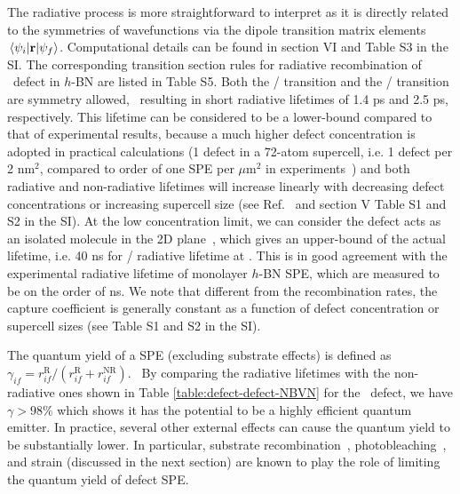 The radiative process is more straightforward to interpret as it is directly related to the symmetries of wavefunctions via the dipole transition matrix elements $\mel{\psi_i}{\textbf{r}}{\psi_f}$.
Computational details can be found in section VI and Table S3 in the SI. The corresponding transition section rules for radiative recombination of \NBVN\ defect in $h$-BN are listed in Table S5.
Both the / transition and the / transition are symmetry allowed,~\cite{abdi2018color} resulting in short radiative lifetimes of 1.4 ps and 2.5 ps, respectively. This lifetime can be considered to be a lower-bound compared to that of experimental results, because a much higher defect concentration is adopted in practical calculations (1 defect in a 72-atom supercell, i.e. 1 defect per 2 nm$^2$, compared to order of one SPE per $\mu$m$^2$ in experiments~\cite{tran2016quantum}) and both radiative and non-radiative lifetimes will increase linearly with decreasing defect concentrations or increasing supercell size (see Ref.~\cite{alkauskas2016tutorial} and section V Table S1 and S2 in the SI).
At the low concentration limit, we can consider the defect acts as an isolated molecule in the 2D plane~\cite{wu2019dimensionality},
which gives an upper-bound of the actual lifetime, i.e. 40 ns for / radiative lifetime at \NBVN.
This is in good agreement with the experimental radiative lifetime of monolayer $h$-BN SPE, which are measured to be on the order of ns.\cite{tran2016quantum,bourrellier2016bright,grosso2017tunable,exarhos2017optical} We note that different from the recombination rates, the capture coefficient is generally constant as a function of defect concentration or supercell sizes (see Table S1 and S2 in the SI).

The quantum yield of a SPE (excluding substrate effects) is defined as $\gamma_{if}=r^\mathrm{R}_{if}/(r^\mathrm{R}_{if}+r^{\mathrm{NR}}_{if})$.~\cite{Book_Optical_Pankove,chevallier2017method,hamanaka2014enhancement} By comparing the radiative lifetimes with the non-radiative ones shown in Table \ref{table:defect-defect-NBVN} for the \NBVN\ defect, we have $\gamma>98\%$ which shows it has the potential to be a highly efficient quantum emitter. In practice, several other external effects can cause the quantum yield to be substantially lower. In particular, substrate recombination~\cite{rosenberger2018electrical}, photobleaching~\cite{martinez2016efficient}, and strain (discussed in the next section) are known to play the role of limiting the quantum yield of defect SPE.


